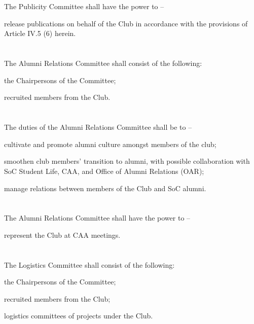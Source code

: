 \section{}
The Publicity Committee shall have the power to –
	\begin{legal}
	\item release publications on behalf of the Club in accordance with the provisions of Article IV.5 (6) herein.
	\end{legal}

\section{}
The Alumni Relations Committee shall consist of the following:
	\begin{legal}
	\item the Chairpersons of the Committee;
	\item recruited members from the Club.
	\end{legal}

\section{}
The duties of the Alumni Relations Committee shall be to –
	\begin{legal}
	\item cultivate and promote alumni culture amongst members of the club;
	\item smoothen club members’ transition to alumni, with possible collaboration with SoC Student Life, CAA, and Office of Alumni Relations (OAR);
	\item manage relations between members of the Club and SoC alumni.
	\end{legal}

\section{}
The Alumni Relations Committee shall have the power to –
	\begin{legal}
	\item represent the Club at CAA meetings.
	\end{legal}

\section{}
The Logistics Committee shall consist of the following:
	\begin{legal}
	\item the Chairpersons of the Committee;
	\item recruited members from the Club;
	\item logistics committees of projects under the Club.
	\end{legal}

